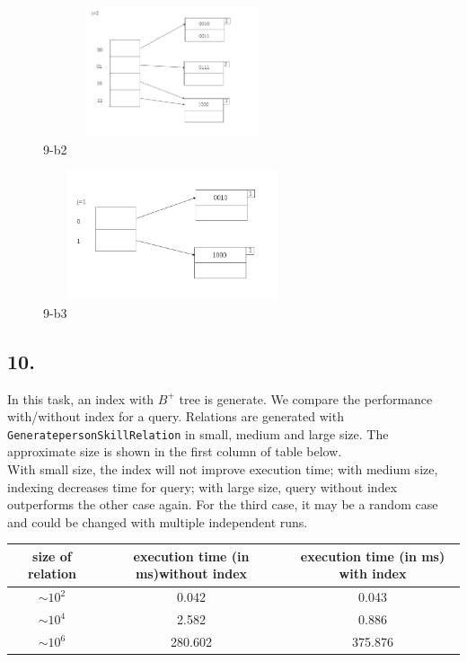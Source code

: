\documentclass[10pt]{article}
\begin{document}
\begin{figure}[h]
        \centering
        \includegraphics[height = 1.5in, width = 3in]{figure/9b2.png}
        \caption{9-b2}
    \end{figure}
\bigskip
\begin{figure}[h]
        \centering
        \includegraphics[height = 1.5in, width = 3in]{figure/9b3.png}
        \caption{9-b3}
    \end{figure}
\bigskip
\clearpage

\subsection*{10.}
In this task, an index with $B^+$ tree is generate. We compare the performance with/without index for a query. Relations are generated with \texttt{GeneratepersonSkillRelation} in small, medium and large size. The approximate size is shown in the first column of table below. \\
With small size, the index will not improve execution time; with medium size, indexing decreases time for query; with large size, query without index outperforms the other case again. For the third case, it may be a random case and could be changed with multiple independent runs.
\begin{table}[H]
\begin{center}
\begin{tabular}{c|c|c}
size of relation & execution time (in ms)without index& execution time (in ms) with index \\ \hline
$\sim 10^2$ & 0.042 & 0.043 \\
$\sim 10^4$ & 2.582 & 0.886 \\
$\sim 10^6$ &280.602& 375.876 \\
\end{tabular}
\end{center}
\end{table}
\end{document}
